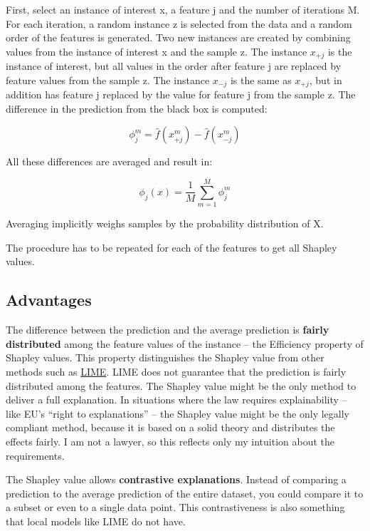\documentclass[
  10pt,
]{scrbook}
\begin{document}
First, select an instance of interest x, a feature j and the number of iterations M.
For each iteration, a random instance z is selected from the data and a random order of the features is generated.
Two new instances are created by combining values from the instance of interest x and the sample z.
The instance \(x_{+j}\) is the instance of interest, but all values in the order after feature j are replaced by feature values from the sample z.
The instance \(x_{-j}\) is the same as \(x_{+j}\), but in addition has feature j replaced by the value for feature j from the sample z.
The difference in the prediction from the black box is computed:

\[\phi_j^{m}=\hat{f}(x^m_{+j})-\hat{f}(x^m_{-j})\]

All these differences are averaged and result in:

\[\phi_j(x)=\frac{1}{M}\sum_{m=1}^M\phi_j^{m}\]

Averaging implicitly weighs samples by the probability distribution of X.

The procedure has to be repeated for each of the features to get all Shapley values.

\hypertarget{advantages-16}{%
\subsection{Advantages}\label{advantages-16}}

The difference between the prediction and the average prediction is \textbf{fairly distributed} among the feature values of the instance -- the Efficiency property of Shapley values.
This property distinguishes the Shapley value from other methods such as \protect\hyperlink{lime}{LIME}.
LIME does not guarantee that the prediction is fairly distributed among the features.
The Shapley value might be the only method to deliver a full explanation.
In situations where the law requires explainability -- like EU's ``right to explanations'' -- the Shapley value might be the only legally compliant method, because it is based on a solid theory and distributes the effects fairly.
I am not a lawyer, so this reflects only my intuition about the requirements.

The Shapley value allows \textbf{contrastive explanations}.
Instead of comparing a prediction to the average prediction of the entire dataset, you could compare it to a subset or even to a single data point.
This contrastiveness is also something that local models like LIME do not have.
\end{document}
